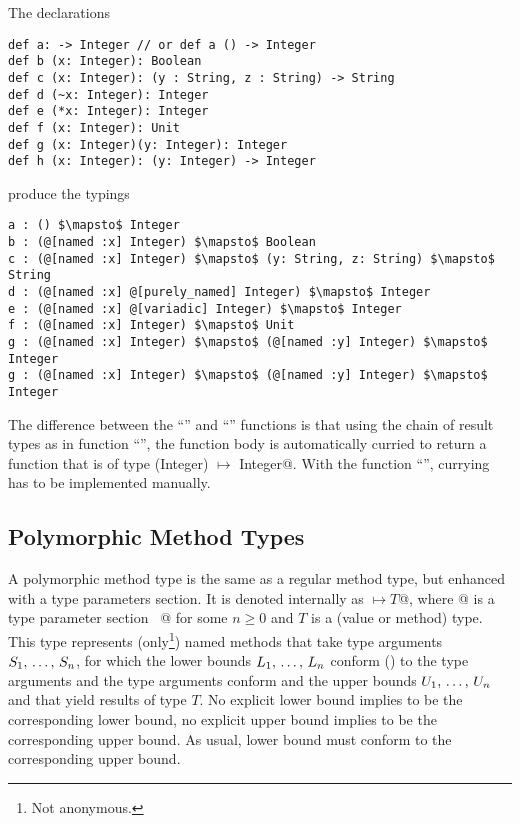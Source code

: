 \example The declarations
\begin{lstlisting}
def a: -> Integer // or def a () -> Integer
def b (x: Integer): Boolean
def c (x: Integer): (y : String, z : String) -> String
def d (~x: Integer): Integer
def e (*x: Integer): Integer
def f (x: Integer): Unit
def g (x: Integer)(y: Integer): Integer
def h (x: Integer): (y: Integer) -> Integer
\end{lstlisting}
produce the typings
\begin{lstlisting}
a : () $\mapsto$ Integer
b : (@[named :x] Integer) $\mapsto$ Boolean
c : (@[named :x] Integer) $\mapsto$ (y: String, z: String) $\mapsto$ String
d : (@[named :x] @[purely_named] Integer) $\mapsto$ Integer
e : (@[named :x] @[variadic] Integer) $\mapsto$ Integer
f : (@[named :x] Integer) $\mapsto$ Unit
g : (@[named :x] Integer) $\mapsto$ (@[named :y] Integer) $\mapsto$ Integer
g : (@[named :x] Integer) $\mapsto$ (@[named :y] Integer) $\mapsto$ Integer
\end{lstlisting}

The difference between the ``'' and ``'' functions is that using the chain of result types as in function ``'', the function body is automatically curried to return a function that is of type \lstinline@(Integer) $\mapsto$ Integer@. With the function ``'', currying has to be implemented manually. 






\subsection{Polymorphic Method Types}
\label{sec:polymorphic-method-types}

A polymorphic method type is the same as a regular method type, but enhanced with a type parameters section. It is denoted internally as \lstinline@[$\tps$]$ \mapsto T$@, where \lstinline@[$\tps$]@ is a type parameter section ~\lstinline@[$\pm a_1$ >: $L_1$ <: $U_1$ $\commadots$ $\pm a_n$ >: $L_n$ <: $U_n$]@ for some $n \geq 0$ and $T$ is a (value or method) type. This type represents (only\footnote{Not anonymous.}) named methods that take type arguments $S_1 ,\, \ldots ,\, S_n$, for which the lower bounds $L_1 ,\, \ldots ,\, L_n$ conform () to the type arguments and the type arguments conform and the upper bounds $U_1 ,\, \ldots ,\, U_n$ and that yield results of type $T$. No explicit lower bound implies  to be the corresponding lower bound, no explicit upper bound implies  to be the corresponding upper bound. As usual, lower bound must conform to the corresponding upper bound. 

